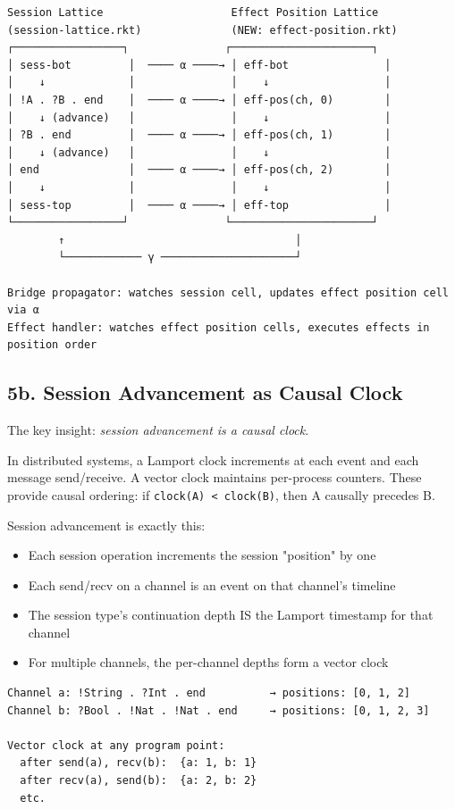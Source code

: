 \documentclass[11pt]{article}
\begin{document}
\begin{verbatim}
Session Lattice                    Effect Position Lattice
(session-lattice.rkt)              (NEW: effect-position.rkt)
┌─────────────────┐               ┌──────────────────────┐
│ sess-bot         │  ──── α ────→ │ eff-bot               │
│    ↓             │               │    ↓                  │
│ !A . ?B . end    │  ──── α ────→ │ eff-pos(ch, 0)        │
│    ↓ (advance)   │               │    ↓                  │
│ ?B . end         │  ──── α ────→ │ eff-pos(ch, 1)        │
│    ↓ (advance)   │               │    ↓                  │
│ end              │  ──── α ────→ │ eff-pos(ch, 2)        │
│    ↓             │               │    ↓                  │
│ sess-top         │  ──── α ────→ │ eff-top               │
└─────────────────┘               └──────────────────────┘
        ↑                                    │
        └──────────── γ ─────────────────────┘

Bridge propagator: watches session cell, updates effect position cell via α
Effect handler: watches effect position cells, executes effects in position order
\end{verbatim}
\subsection{5b. Session Advancement as Causal Clock}
\label{sec:org1c4e8e2}

The key insight: \emph{session advancement is a causal clock}.

In distributed systems, a Lamport clock increments at each event and each
message send/receive. A vector clock maintains per-process counters. These
provide causal ordering: if \texttt{clock(A) < clock(B)}, then A causally precedes B.

Session advancement is exactly this:
\begin{itemize}
\item Each session operation increments the session "position" by one
\item Each send/recv on a channel is an event on that channel's timeline
\item The session type's continuation depth IS the Lamport timestamp for that channel
\item For multiple channels, the per-channel depths form a vector clock
\end{itemize}

\begin{verbatim}
Channel a: !String . ?Int . end          → positions: [0, 1, 2]
Channel b: ?Bool . !Nat . !Nat . end     → positions: [0, 1, 2, 3]

Vector clock at any program point:
  after send(a), recv(b):  {a: 1, b: 1}
  after recv(a), send(b):  {a: 2, b: 2}
  etc.
\end{verbatim}
\end{document}
